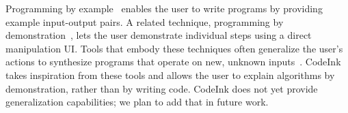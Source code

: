 Programming by example~\cite{Lieberman2001} enables the user to write programs by
providing example input-output pairs. A related technique, programming by
demonstration~\cite{Cypher1993}, lets the user demonstrate individual steps
using a direct manipulation UI. Tools that embody these techniques often
generalize the user's actions to synthesize programs that operate on new,
unknown inputs~\cite{Yessenov2013, Kandel2011}.
CodeInk takes inspiration from these tools and allows the user to explain
algorithms by demonstration, rather than by writing code. CodeInk does not yet
provide generalization capabilities; we plan to add that in future work.



